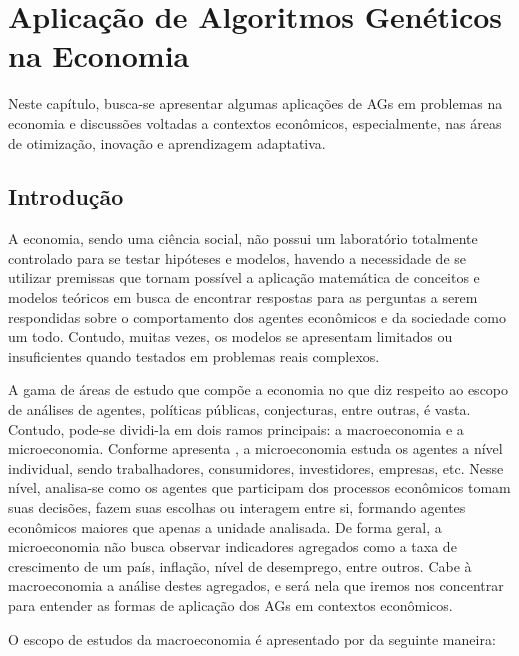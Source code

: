 \chapter{Aplicação de Algoritmos Genéticos na Economia}

Neste capítulo, busca-se apresentar algumas aplicações de AGs em problemas na economia e discussões voltadas a contextos econômicos, especialmente, nas áreas de otimização, inovação e aprendizagem adaptativa.

\section{Introdução}

A economia, sendo uma ciência social, não possui um laboratório totalmente controlado para se testar hipóteses e modelos, havendo a necessidade de se utilizar premissas que tornam possível a aplicação matemática de conceitos e modelos teóricos em busca de encontrar respostas para as perguntas a serem respondidas sobre o comportamento dos agentes econômicos e da sociedade como um todo. Contudo, muitas vezes, os modelos se apresentam limitados ou insuficientes quando testados em problemas reais complexos.

A gama de áreas de estudo que compõe a economia  no que diz respeito ao escopo de análises de agentes, políticas públicas, conjecturas, entre outras, é vasta. Contudo, pode-se dividi-la em dois ramos principais: a macroeconomia e a microeconomia. Conforme apresenta \citet[pg.3]{pindyck_microeconomia_2013}, a microeconomia estuda os agentes a nível individual, sendo trabalhadores, consumidores, investidores, empresas, etc. Nesse nível, analisa-se como os agentes que participam dos processos econômicos tomam suas decisões, fazem suas escolhas ou interagem entre si, formando agentes econômicos maiores que apenas a unidade analisada. De forma geral, a microeconomia não busca observar indicadores agregados como a taxa de crescimento de um país, inflação, nível de desemprego, entre outros. Cabe à macroeconomia a análise destes agregados, e será nela que iremos nos concentrar para entender as formas de aplicação dos AGs em contextos econômicos.

O escopo de estudos da macroeconomia é apresentado por \citeauthor*{snowdon_modern_2005} da seguinte maneira:

